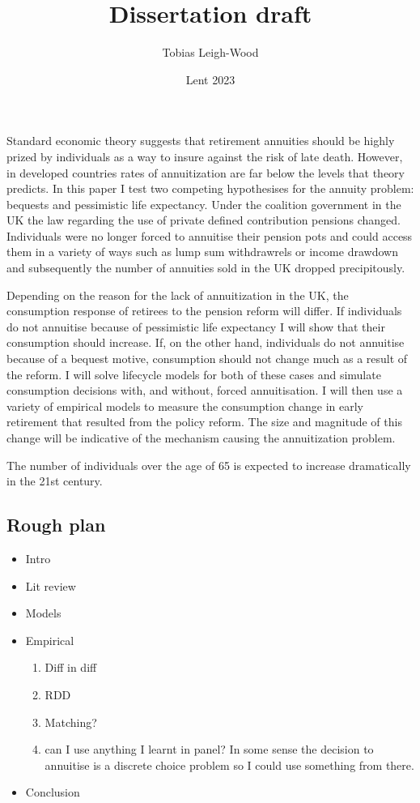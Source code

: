 \documentclass[12pt]{article}
\date{Lent 2023}
\title{Dissertation draft}
\author{Tobias Leigh-Wood}
\begin{document}
\maketitle


Standard economic theory suggests that retirement annuities should be highly prized by individuals as a way to
insure against the risk of late death. However, in developed countries rates of annuitization are far below the
levels that theory predicts. In this paper I test two competing hypothesises for the annuity problem: bequests and
pessimistic life expectancy. Under the coalition government in the UK the law regarding the use of private defined
contribution pensions changed. Individuals were no longer forced to annuitise their pension pots and could access
them in a variety of ways such as lump sum withdrawrels or income drawdown and subsequently the number of annuities
sold in the UK dropped precipitously.

Depending on the reason for the lack of annuitization in the UK, the consumption response of retirees to the pension
reform will differ. If individuals do not annuitise because of pessimistic life expectancy I will show that their
consumption should increase. If, on the other hand, individuals do not annuitise because of a bequest motive, consumption
should not change much as a result of the reform. I will solve lifecycle models for both of these cases and simulate
consumption decisions with, and without, forced annuitisation. I will then use a variety of empirical models to measure
the consumption change in early retirement that resulted from the policy reform. The size and magnitude of this change
will be indicative of the mechanism causing the annuitization problem.

The number of individuals over the age of 65 is expected to increase dramatically in the 21st century.


\subsection{Rough plan}
\begin{itemize}
      \item Intro
      \item Lit review
      \item Models
      \item Empirical
            \begin{enumerate}
                  \item Diff in diff
                  \item RDD
                  \item Matching?
                  \item can I use anything I learnt in panel?
                        In some sense the decision to annuitise is a discrete choice problem so I could use something from there.
            \end{enumerate}
      \item Conclusion
\end{itemize}




\end{document}
